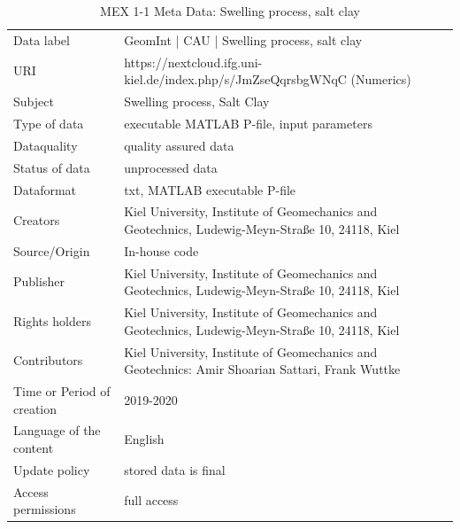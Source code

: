 \begin{table}[!ht]
\caption{MEX 1-1 Meta Data: Swelling process, salt clay}
\label{tab:dms-mex1-1b}
\small
\begin{tabular}{R{3cm}|L{7cm}}
\hline
%
Data label & GeomInt | CAU | Swelling process, salt clay\\
URI &  https://nextcloud.ifg.uni-kiel.de/index.php/s/JmZseQqrsbgWNqC (Numerics)\\
Subject  &  Swelling process, Salt Clay\\
Type of data  & executable MATLAB P-file, input parameters\\
Dataquality  &  quality assured data \\
Status of data  &  unprocessed data\\
Dataformat  & txt, MATLAB executable P-file\\
Creators  &  Kiel University, Institute of Geomechanics and Geotechnics, Ludewig-Meyn-Stra\ss e 10, 24118, Kiel\\
Source/Origin & In-house code \\
Publisher  &  Kiel University, Institute of Geomechanics and Geotechnics, Ludewig-Meyn-Stra\ss e 10, 24118, Kiel \\
Rights holders &  Kiel University, Institute of Geomechanics and Geotechnics, Ludewig-Meyn-Stra\ss e 10, 24118, Kiel \\
Contributors &   Kiel University, Institute of Geomechanics and Geotechnics: Amir Shoarian Sattari, Frank Wuttke\\
Time or Period of creation &  2019-2020\\
Language of the content &  English\\
Update policy &  stored data is final\\
Access permissions & full access\\
%
\hline
\end{tabular}
\end{table}